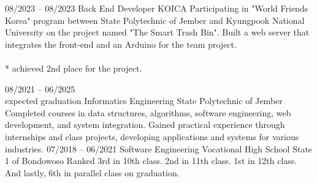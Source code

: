 \documentclass[9pt]{developercv} %
\begin{document}
\vspace{-10 pt}
\begin{entrylist}
	\entry
	{08/2023 -- 08/2023}
	{Back End Developer}
	{KOICA}
	{Participating in "World Friends Korea" program between State Polytechnic of Jember and Kyungpook National University on the project named "The Smart Trash Bin". Built a web server that integrates the front-end and an Arduino for the team project.
	\vspace{-7 pt}
	\\ \\
	{* achieved 2nd place for the project.}
	}
\end{entrylist}


\vspace{-10 pt}
\begin{entrylist}
	\entry
	{08/2021 -- 06/2025 \\\footnotesize{expected graduation}}
	{Informatics Engineering}
	{State Polytechnic of Jember}
	{Completed courses in data structures, algorithms, software engineering, web development, and system integration. Gained practical experience through internships and class projects, developing applications and systems for various industries.}
	\entry
	{07/2018 -- 06/2021}
	{Software Engineering}
	{Vocational High School State 1 of Bondowoso}
	{\vspace{-10pt}
		Ranked 3rd in 10th class. 2nd in 11th class. 1st in 12th class. And lastly,  6th in parallel class on graduation.
	}
\end{entrylist}
\end{document}
